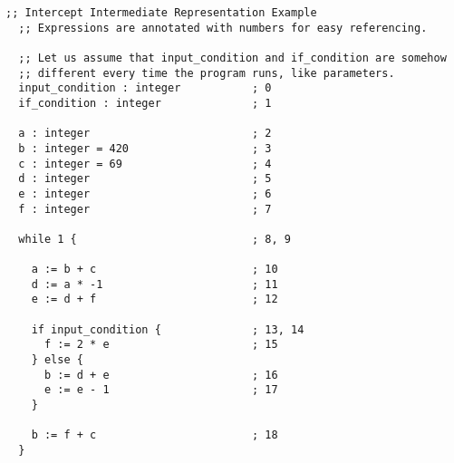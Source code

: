 \documentclass[12pt]{report}
\begin{document}
\begin{Verbatim}[samepage = true]
  ;; Intercept Intermediate Representation Example
  ;; Expressions are annotated with numbers for easy referencing.

  ;; Let us assume that input_condition and if_condition are somehow
  ;; different every time the program runs, like parameters.
  input_condition : integer           ; 0
  if_condition : integer              ; 1

  a : integer                         ; 2
  b : integer = 420                   ; 3
  c : integer = 69                    ; 4
  d : integer                         ; 5
  e : integer                         ; 6
  f : integer                         ; 7

  while 1 {                           ; 8, 9

    a := b + c                        ; 10
    d := a * -1                       ; 11
    e := d + f                        ; 12

    if input_condition {              ; 13, 14
      f := 2 * e                      ; 15
    } else {
      b := d + e                      ; 16
      e := e - 1                      ; 17
    }

    b := f + c                        ; 18
  }
\end{Verbatim}
\end{document}
